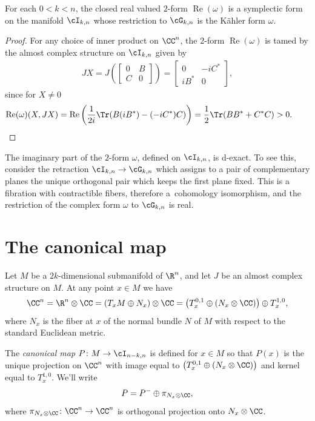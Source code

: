 \begin{thm}For each $0 < k < n$, the closed real valued $2$-form $\operatorname{Re}(\omega)$ is a symplectic form on the manifold $\cI_{k,n}$ whose restriction to $\cG_{k,n}$ is the K\"ahler form $\omega$.
\end{thm}

\begin{proof} For any choice of inner product on $\CC^n$, the $2$-form $\operatorname{Re}(\omega)$ is tamed by the almost complex structure on $\cI_{k,n}$ given by
\begin{gather*}
JX = J\left(
\begin{bmatrix}
0 & B \\
C & 0
\end{bmatrix}
\right)
=
\begin{bmatrix}
0 & -iC^* \\
iB^* & 0
\end{bmatrix},
\end{gather*}
since for $X\neq 0$
\begin{gather*}
\operatorname{Re}(\omega)(X,JX) = \operatorname{Re} \left ( \frac {1}{2i} \Tr ( B(iB^*) - (-iC^*)C) \right) = \frac 1 2 \Tr(BB^* + C^*C) > 0.\tag*{\qed}
\end{gather*} \renewcommand{\qed}{}
\end{proof}

The imaginary part of the $2$-form $\omega$, defined on $\cI_{k,n}$, is d-exact. To see this, consider the retraction $\cI_{k,n} \to \cG_{k,n}$ which assigns to a pair of complementary planes the unique orthogonal pair which keeps the first plane fixed. This is a fibration with contractible fibers, therefore a~cohomology isomorphism, and the restriction of the complex form $\omega$ to $\cG_{k,n}$ is real.

\section{The canonical map} \label{sec;Pmap}

\begin{defn}
Let $M$ be a $2k$-dimensional submanifold of $\R^n$, and let $J$ be an almost complex structure on $M$. At any point $x \in M$ we have
\begin{gather*}
\CC^n = \R^n \otimes \CC = ( T_x M \oplus N_x ) \otimes \CC = \big( T^{0,1}_x \oplus ( N_x \otimes \CC ) \big) \oplus T^{1,0}_x,
\end{gather*}
where $N_x$ is the fiber at $x$ of the normal bundle $N$ of $M$ with respect to the standard Euclidean metric.

The \emph{canonical map} $P\colon M \to \cI_{n-k,n}$ is defined for $x \in M$ so that $P(x)$ is the unique projection on $\CC^n$ with image equal to $\big( T^{0,1}_x \oplus ( N_x \otimes \CC) \big)$ and kernel equal to $T^{1,0}_x$. We'll write
\begin{gather*}
P = P^- \oplus \pi_{N_x \otimes \CC},
\end{gather*}
where $\pi_{N_x \otimes \CC}\colon \CC^n \to \CC^n$ is orthogonal projection onto $N_x \otimes \CC$.
\end{defn}

